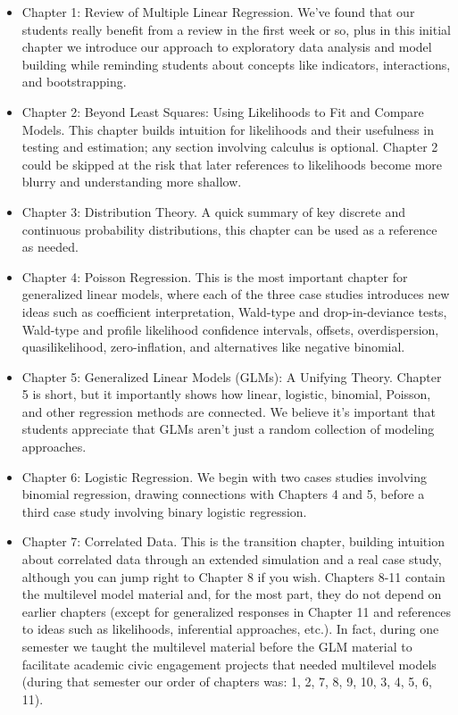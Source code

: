 \documentclass[
]{krantz}
\providecommand{\tightlist}{%
  \setlength{\itemsep}{0pt}\setlength{\parskip}{0pt}}
\begin{document}
\begin{itemize}
\tightlist
\item
  Chapter 1: Review of Multiple Linear Regression. We've found that our students really benefit from a review in the first week or so, plus in this initial chapter we introduce our approach to exploratory data analysis and model building while reminding students about concepts like indicators, interactions, and bootstrapping.
\item
  Chapter 2: Beyond Least Squares: Using Likelihoods to Fit and Compare Models. This chapter builds intuition for likelihoods and their usefulness in testing and estimation; any section involving calculus is optional. Chapter 2 could be skipped at the risk that later references to likelihoods become more blurry and understanding more shallow.
\item
  Chapter 3: Distribution Theory. A quick summary of key discrete and continuous probability distributions, this chapter can be used as a reference as needed.
\item
  Chapter 4: Poisson Regression. This is the most important chapter for generalized linear models, where each of the three case studies introduces new ideas such as coefficient interpretation, Wald-type and drop-in-deviance tests, Wald-type and profile likelihood confidence intervals, offsets, overdispersion, quasilikelihood, zero-inflation, and alternatives like negative binomial.
\item
  Chapter 5: Generalized Linear Models (GLMs): A Unifying Theory. Chapter 5 is short, but it importantly shows how linear, logistic, binomial, Poisson, and other regression methods are connected. We believe it's important that students appreciate that GLMs aren't just a random collection of modeling approaches.
\item
  Chapter 6: Logistic Regression. We begin with two cases studies involving binomial regression, drawing connections with Chapters 4 and 5, before a third case study involving binary logistic regression.
\item
  Chapter 7: Correlated Data. This is the transition chapter, building intuition about correlated data through an extended simulation and a real case study, although you can jump right to Chapter 8 if you wish. Chapters 8-11 contain the multilevel model material and, for the most part, they do not depend on earlier chapters (except for generalized responses in Chapter 11 and references to ideas such as likelihoods, inferential approaches, etc.). In fact, during one semester we taught the multilevel material before the GLM material to facilitate academic civic engagement projects that needed multilevel models (during that semester our order of chapters was: 1, 2, 7, 8, 9, 10, 3, 4, 5, 6, 11).

\end{itemize}
\end{document}
